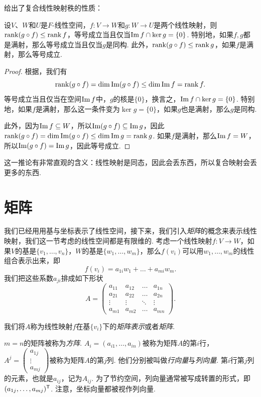  给出了复合线性映射秩的性质：
\begin{corollary}\label{corollary:rank-composition}
设$V$、$W$和$U$是$F$-线性空间，$f:V\to W$和$g:W\to U$是两个线性映射，则$\operatorname*{rank} (g\circ f)\leq \operatorname*{rank} f$，等号成立当且仅当$\operatorname*{Im} f\cap \ker g=\{0\}$. 特别地，如果$f,g$都是满射，那么等号成立当且仅当$g$是同构. 此外，$\operatorname*{rank} (g\circ f)\leq \operatorname*{rank} g$，如果$f$是满射，那么等号成立. 
\end{corollary}
\begin{proof}
    根据，我们有
    \[\operatorname*{rank} (g\circ f)=\dim\operatorname*{Im} (g\circ f)\leq \dim \operatorname*{Im} f=\operatorname*{rank} f.\]
    等号成立当且仅当在空间$\operatorname*{Im} f$中，$g$的核是$\{0\}$，换言之，$\operatorname*{Im} f\cap \ker g=\{0\}$. 特别地，如果$f$是满射，那么这一条件变为$\ker g=\{0\}$，如果$g$也是满射，那么$g$是同构. 
    
    此外，因为$\operatorname*{Im} f\subseteq W$，所以$\operatorname*{Im} (g\circ f)\subseteq \operatorname*{Im} g$，因此$\operatorname*{rank} (g\circ f)=\dim\operatorname*{Im} (g\circ f)\leq \dim \operatorname*{Im} g=\operatorname*{rank} g$. 如果$f$是满射，那么$\operatorname*{Im} f=W$，所以$\operatorname*{Im} (g\circ f)=\operatorname*{Im} g$，因此等号成立. 
\end{proof}

这一推论有非常直观的含义：线性映射是同态，因此会丢东西，所以复合映射会丢更多的东西. 

\section{矩阵}\label{sec:matrix}

我们已经用用基与坐标表示了线性空间，接下来，我们引入\textit{矩阵}的概念来表示线性映射，我们这一节考虑的线性空间都是有限维的. 考虑一个线性映射$f:V\to W$，如果$V$的基是$\{v_1,\dots,v_n\}$，$W$的基是$\{w_1,\dots,w_m\}$，那么$f(v_i)$可以用$w_1,\dots,w_m$的线性组合表示出来，即
\[f(v_i)=a_{1i}w_1+\dots+a_{mi}w_m.\]
我们把这些系数$a_{ji}$排成如下形状
\[A=\begin{pmatrix}
a_{11}&a_{12}&\dots&a_{1n}\\
a_{21}&a_{22}&\dots&a_{2n}\\
\vdots&\vdots&\ddots&\vdots\\
a_{m1}&a_{m2}&\dots&a_{mn}
\end{pmatrix}.\]

我们将$A$称为线性映射$f$在基$\{v_i\}$下的\textit{矩阵表示}或者\textit{矩阵}.

$m=n$的矩阵被称为\textit{方阵}. $A_i=(a_{i1},\dots,a_{in})$被称为矩阵$A$的第$i$行，$A^j=\begin{pmatrix}a_{1j}\\\vdots\\a_{mj}\end{pmatrix}$被称为矩阵$A$的第$j$列. 他们分别被叫做\textit{行向量}与\textit{列向量}. 第$i$行第$j$列的元素，也就是$a_{ij}$，记为$A_{ij}$. 为了节约空间，列向量通常被写成转置的形式，即$(a_{1j},\dots,a_{mj})^{\mathsf{T}}$. 注意，坐标向量都被视作列向量. 


